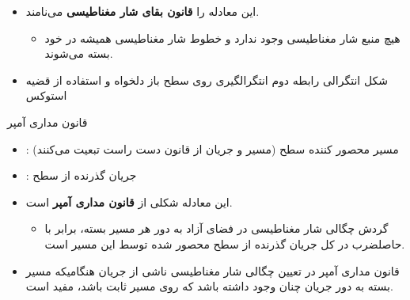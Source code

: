 \begin{ELunit}

\begin{itemize}
\tightlist
\item
  این معادله را \textbf{قانون بقای شار مغناطیسی} می‌نامند.

  \begin{itemize}
  \tightlist
  \item
    هیچ منبع شار مغناطیسی وجود ندارد و خطوط شار مغناطیسی همیشه در خود بسته می‌شوند.
  \end{itemize}
\item
  شکل انتگرالی رابطه دوم \ELim{\ELto} انتگرالگیری روی سطح باز دلخواه  و استفاده از قضیه استوکس
\end{itemize}


\end{ELunit}

\begin{ELimportant}{قانون مداری آمپر}


\end{ELimportant}

\begin{ELunit}

\begin{itemize}
\tightlist
\item
  : مسیر محصور کننده سطح  (مسیر  و جریان  از قانون دست راست تبعیت می‌کنند)
\item
  : جریان گذرنده از سطح 
\item
  این معادله شکلی از \textbf{قانون مداری آمپر} است.

  \begin{itemize}
  \tightlist
  \item
    گردش چگالی شار مغناطیسی در فضای آزاد به دور هر مسیر بسته، برابر با حاصلضرب  در کل جریان گذرنده از سطح محصور شده توسط این مسیر است.
  \end{itemize}
\item
  قانون مداری آمپر در تعیین چگالی شار مغناطیسی ناشی از جریان  هنگامیکه مسیر بسته  به دور جریان چنان وجود داشته باشد که  روی مسیر ثابت باشد، مفید است.
\end{itemize}

\end{ELunit}

